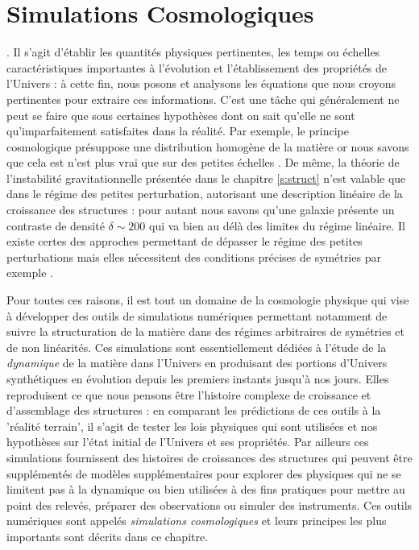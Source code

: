 \chapter{Simulations Cosmologiques}

. Il s'agit d'établir les quantités physiques pertinentes, les temps ou échelles caractéristiques importantes à l'évolution et l'établissement des propriétés de l'Univers : à cette fin, nous posons et analysons les équations que nous croyons pertinentes pour extraire ces informations. C'est une tâche qui généralement ne peut se faire que sous certaines hypothèses dont on sait qu'elle ne sont qu'imparfaitement satisfaites dans la réalité. Par exemple, le principe cosmologique présuppose une distribution homogène de la matière or nous savons que cela est n'est plus vrai que sur des petites échelles .  De même, la théorie de l'instabilité gravitationnelle présentée dans le chapitre \ref{s:struct} n'est valable que dans le régime des petites perturbation, autorisant une description linéaire de la croissance des structures : pour autant nous savons qu'une galaxie présente un contraste de densité $\delta \sim 200$ qui va bien au délà des limites du régime linéaire. Il existe certes des approches permettant de dépasser le régime des petites perturbations mais elles nécessitent des conditions précises de symétries par exemple .


Pour toutes ces raisons, il est tout un domaine de la cosmologie physique qui vise à développer des outils de simulations numériques permettant notamment de suivre la structuration de la matière dans des régimes arbitraires de symétries et de non linéarités. Ces simulations sont essentiellement dédiées à l'étude de la \textit{dynamique} de la matière dans l'Univers en produisant des portions d'Univers synthétiques en évolution depuis les premiers instants jusqu'à nos jours. Elles reproduisent ce que nous pensons être l'histoire complexe de croissance et d'assemblage des structures : en comparant les prédictions de ces outils à la 'réalité terrain', il s'agit de tester les lois physiques qui sont utilisées et nos hypothèses sur l'état initial de l'Univers et ses propriétés. Par ailleurs ces simulations fournissent des histoires de croissances des structures qui peuvent être supplémentés de modèles supplémentaires pour explorer des physiques qui ne se limitent pas à la dynamique ou bien utilisées à des fins pratiques pour mettre au point des relevés, préparer des observations ou simuler des instruments. Ces outils numériques sont appelés \textit{simulations cosmologiques} et leurs principes les plus importants sont décrits dans ce chapitre.

